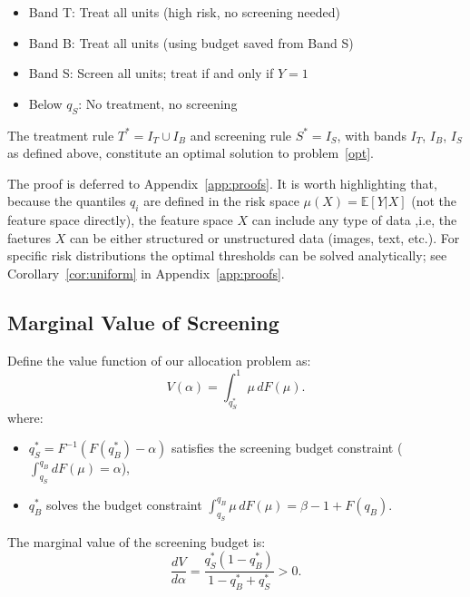\begin{itemize}
       \item Band T: Treat all units (high risk, no screening needed)
       \item Band B: Treat all units (using budget saved from Band S)
       \item Band S: Screen all units; treat if and only if $Y = 1$
       \item Below $q_S$: No treatment, no screening
\end{itemize}

\begin{theorem}\label{thm:Optimal screening}
The treatment rule $T^* = I_T \cup I_B$ and screening rule $S^* = I_S$, with bands $I_T$, $I_B$, $I_S$ as defined above, constitute an optimal solution to problem~\ref{opt}.
\end{theorem}

The proof is deferred to Appendix~\ref{app:proofs}. It is worth highlighting that, because the quantiles $q_i$ are defined in the risk space $\mu(X) = \mathbb{E}[Y|X]$ (not the feature space directly), the feature space $X$ can include any type of data ,i.e, the faetures $X$ can be either structured or unstructured data (images, text, etc.). For specific risk distributions the optimal thresholds can be solved analytically; see Corollary~\ref{cor:uniform} in Appendix~\ref{app:proofs}.


\subsection{Marginal Value of Screening}
\label{app:marginal_value}

Define the value function of our allocation problem as:
\begin{equation}\label{eq:value}
    V(\alpha) = \int_{q_S^*}^{1} \mu \, dF(\mu).
\end{equation}
where:
\begin{itemize}
    \item $q_S^* = F^{-1}(F(q_B^*) - \alpha)$ satisfies the screening budget constraint ($\int_{q_S}^{q_B}dF(\mu) = \alpha$),
    \item $q_B^*$ solves the budget constraint $\int_{q_S}^{q_B} \mu \, dF(\mu) = \beta - 1 + F(q_B)$.
\end{itemize}

\begin{theorem}
\label{thm:dV}
The marginal value of the screening budget is:
\begin{equation}
    \frac{dV}{d\alpha} = \frac{q_S^*(1 - q_B^*)}{1 - q_B^* + q_S^*} > 0.
    \label{eq:dV_dalpha}
\end{equation}
\end{theorem}

